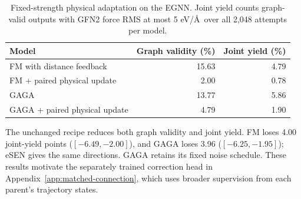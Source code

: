 \begin{table}[htbp]
\centering
\caption{Fixed-strength physical adaptation on the EGNN. Joint yield counts graph-valid outputs with GFN2 force RMS at most 5 eV/\AA\ over all 2,048 attempts per model.}
\begin{tabular}{lrr}
\toprule
Model & Graph validity (\%) & Joint yield (\%)\\
\midrule
FM with distance feedback &15.63&4.79\\
FM + paired physical update &2.00&0.78\\
GAGA &13.77&5.86\\
GAGA + paired physical update &4.79&1.90\\
\bottomrule
\end{tabular}
\end{table}

The unchanged recipe reduces both graph validity and joint yield. FM loses 4.00 joint-yield points ($[-6.49,-2.00]$), and GAGA loses 3.96 ($[-6.25,-1.95]$); eSEN gives the same directions. GAGA retains its fixed noise schedule. These results motivate the separately trained correction head in Appendix~\ref{app:matched-connection}, which uses broader supervision from each parent's trajectory states.
